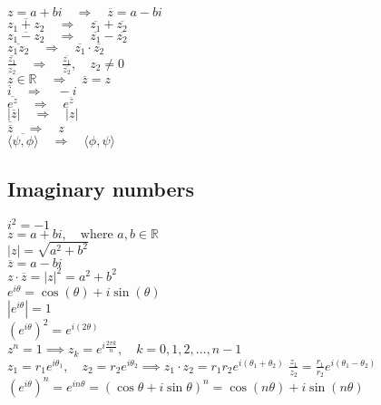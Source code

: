 \documentclass[a4paper,8pt,fleqn]{article}
\begin{document}
\begin{multicols}{3}
\begin{minipage}{\linewidth}
\( z = a + bi \quad \Rightarrow \quad \overline{z} = a - bi \)\\
\( \overline{z_1 + z_2} \quad \Rightarrow \quad \overline{z_1} + \overline{z_2} \)\\
\( \overline{z_1 - z_2} \quad \Rightarrow \quad \overline{z_1} - \overline{z_2} \)\\
\( \overline{z_1 z_2} \quad \Rightarrow \quad \overline{z_1} \cdot \overline{z_2} \)\\
\( \overline{\frac{z_1}{z_2}} \quad \Rightarrow \quad \frac{\overline{z_1}}{\overline{z_2}}, \quad z_2 \neq 0 \)\\
\( z \in \mathbb{R} \quad \Rightarrow \quad \overline{z} = z \)\\
\( \overline{i} \quad \Rightarrow \quad -i \)\\
\( \overline{e^z} \quad \Rightarrow \quad e^{\overline{z}} \)\\
\( |\overline{z}| \quad \Rightarrow \quad |z| \)\\
\( \overline{\overline{z}} \quad \Rightarrow \quad z \)\\
\( \overline{\langle \psi, \phi \rangle} \quad \Rightarrow \quad \langle \phi, \psi \rangle \)\\


\end{minipage}
\begin{minipage}{\linewidth}

\subsection{Imaginary numbers}

\( i^2 = -1 \) \\ 
\( z = a + bi, \quad \text{where } a, b \in \mathbb{R} \) \\
\( |z| = \sqrt{a^2 + b^2} \) \\
\( \overline{z} = a - bi \) \\
\( z \cdot \overline{z} = |z|^2 = a^2 + b^2 \) \\
\( e^{i\theta} = \cos(\theta) + i\sin(\theta) \) \\
\( |e^{i\theta}| = 1 \) \\
\( \left(e^{i\theta}\right)^2 = e^{i(2\theta)} \) \\
\( z^n = 1 \implies z_k = e^{i\frac{2\pi k}{n}}, \quad k = 0, 1, 2, \dots, n-1 \) \\
\( z_1 = r_1 e^{i\theta_1}, \quad z_2 = r_2 e^{i\theta_2} \implies
z_1 \cdot z_2 = r_1 r_2 e^{i(\theta_1 + \theta_2)} \)
\( \frac{z_1}{z_2} = \frac{r_1}{r_2} e^{i(\theta_1 - \theta_2)} \) \\
\( \left(e^{i\theta}\right)^n = e^{i n \theta} = (\cos\theta + i\sin\theta)^n = \cos(n\theta) + i\sin(n\theta) \) \\
\end{minipage}



\end{multicols}
\end{document}
